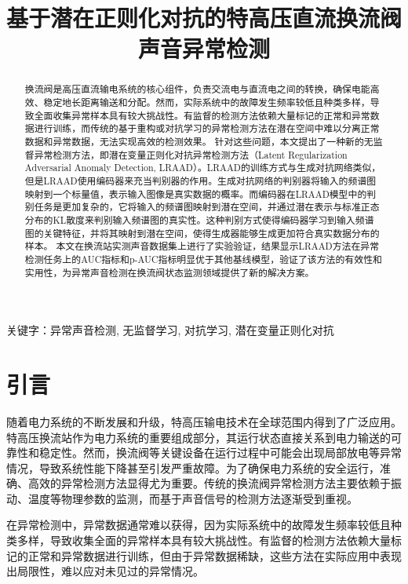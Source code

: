 \documentclass{article}
\title{基于潜在正则化对抗的特高压直流换流阀声音异常检测}
\begin{document}
\maketitle

\begin{abstract}

换流阀是高压直流输电系统的核心组件，负责交流电与直流电之间的转换，确保电能高效、稳定地长距离输送和分配。然而，实际系统中的故障发生频率较低且种类多样，导致全面收集异常样本具有较大挑战性。有监督的检测方法依赖大量标记的正常和异常数据进行训练，而传统的基于重构或对抗学习的异常检测方法在潜在空间中难以分离正常数据和异常数据，无法实现高效的检测效果。
针对这些问题，本文提出了一种新的无监督异常检测方法，即潜在变量正则化对抗异常检测方法（Latent Regularization Adversarial Anomaly Detection, LRAAD）。LRAAD的训练方式与生成对抗网络类似，但是LRAAD使用编码器来充当判别器的作用。生成对抗网络的判别器将输入的频谱图映射到一个标量值，表示输入图像是真实数据的概率。而编码器在LRAAD模型中的判别任务是更加复杂的，它将输入的频谱图映射到潜在空间，并通过潜在表示与标准正态分布的KL散度来判别输入频谱图的真实性。这种判别方式使得编码器学习到输入频谱图的关键特征，并将其映射到潜在空间，使得生成器能够生成更加符合真实数据分布的样本。
本文在换流站实测声音数据集上进行了实验验证，结果显示LRAAD方法在异常检测任务上的AUC指标和p-AUC指标明显优于其他基线模型，验证了该方法的有效性和实用性，为异常声音检测在换流阀状态监测领域提供了新的解决方案。

\end{abstract}


关键字：异常声音检测, 无监督学习, 对抗学习, 潜在变量正则化对抗

\section{引言}
随着电力系统的不断发展和升级，特高压输电技术在全球范围内得到了广泛应用。特高压换流站作为电力系统的重要组成部分，其运行状态直接关系到电力输送的可靠性和稳定性。然而，换流阀等关键设备在运行过程中可能会出现局部放电等异常情况，导致系统性能下降甚至引发严重故障。为了确保电力系统的安全运行，准确、高效的异常检测方法显得尤为重要。传统的换流阀异常检测方法主要依赖于振动、温度等物理参数的监测，而基于声音信号的检测方法逐渐受到重视\cite{AR-AD}。

在异常检测中，异常数据通常难以获得，因为实际系统中的故障发生频率较低且种类多样，导致收集全面的异常样本具有较大挑战性。有监督的检测方法依赖大量标记的正常和异常数据进行训练，但由于异常数据稀缺，这些方法在实际应用中表现出局限性，难以应对未见过的异常情况。
\end{document}

